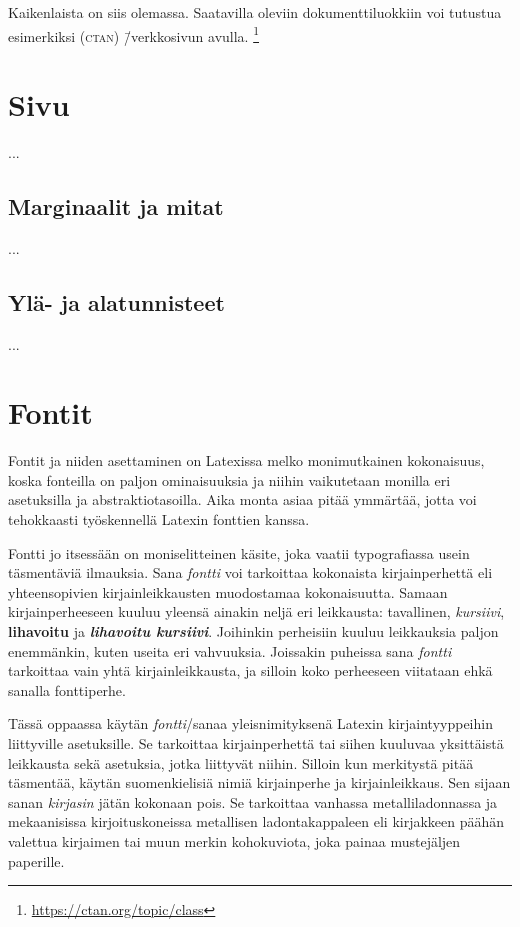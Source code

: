 Kaikenlaista on siis olemassa. Saatavilla oleviin dokumenttiluokkiin voi
tutustua esimerkiksi 
(\textsc{ctan}) \=/verkkosivun avulla.%
\footnote{\url{https://ctan.org/topic/class}}

\section{Sivu}
\label{luku:sivuasetukset}

...

\subsection{Marginaalit ja mitat}

...

\subsection{Ylä- ja alatunnisteet}

...

\section{Fontit}
\label{luku:kirjaintyypit}

Fontit ja niiden asettaminen on Latexissa melko monimutkainen
kokonaisuus, koska fonteilla on paljon ominaisuuksia ja niihin
vaikutetaan monilla eri asetuksilla ja abstraktiotasoilla. Aika monta
asiaa pitää ymmärtää, jotta voi tehokkaasti työskennellä Latexin
fonttien kanssa.

Fontti jo itsessään on moniselitteinen käsite, joka vaatii typografiassa
usein täsmentäviä ilmauksia. Sana \emph{fontti} voi tarkoittaa
kokonaista kirjainperhettä eli yhteensopivien kirjainleikkausten
muodostamaa kokonaisuutta. Samaan kirjainperheeseen kuuluu yleensä
ainakin neljä eri leikkausta: tavallinen, \textit{kursiivi},
\textbf{lihavoitu} ja \textbf{\textit{lihavoitu kursiivi}}. Joihinkin
perheisiin kuuluu leikkauksia paljon enemmänkin, kuten useita eri
vahvuuksia. Joissakin puheissa sana \emph{fontti} tarkoittaa vain yhtä
kirjainleikkausta, ja silloin koko perheeseen viitataan ehkä sanalla
fonttiperhe.

Tässä oppaassa käytän \emph{fontti}\-/sanaa yleisnimityksenä Latexin
kirjaintyyppeihin liittyville asetuksille. Se tarkoittaa kirjainperhettä
tai siihen kuuluvaa yksittäistä leikkausta sekä asetuksia, jotka
liittyvät niihin. Silloin kun merkitystä pitää täsmentää, käytän
suomenkielisiä nimiä kirjainperhe ja kirjainleikkaus. Sen sijaan sanan
\emph{kirjasin} jätän kokonaan pois. Se tarkoittaa vanhassa
metalliladonnassa ja mekaanisissa kirjoituskoneissa metallisen
ladontakappaleen eli kirjakkeen päähän valettua kirjaimen tai muun
merkin kohokuviota, joka painaa mustejäljen paperille.

